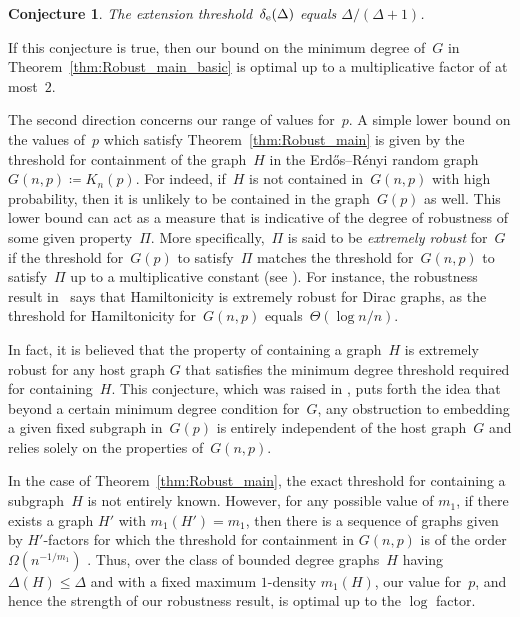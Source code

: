 \documentclass[final]{article}
\newtheorem{conj}[theorem]{Conjecture}
\theoremstyle{definition}
\newcommand{\exth}{\delta_{\rm e}(\Delta)}
\begin{document}
\begin{conj}
  The extension threshold~$\exth$ equals $\Delta/(\Delta+1)$.
\end{conj}

If this conjecture is true, then our
bound on the minimum degree of~$G$ in Theorem~\ref{thm:Robust_main_basic} is optimal up to a multiplicative factor of at most~$2$.

The second direction concerns our range of values for~$p$. A simple lower
bound on the values of~$p$ which satisfy Theorem~\ref{thm:Robust_main}
is given by the threshold for containment of the graph~$H$ in the Erd\H
os--R\'{e}nyi random graph~$G(n, p) \coloneqq K_n(p)$. For indeed, if~$H$ is not contained in~$G(n,p)$ with high probability, then it is unlikely to be contained in the graph~$G(p)$ as well. This lower
bound can act as a measure that is indicative of the degree of robustness of some given
property~$\Pi$. More specifically,~$\Pi$ is said to be \emph{extremely robust} for~$G$ if the
threshold for~$G(p)$ to satisfy~$\Pi$ matches the
threshold for~$G(n,p)$ to satisfy~$\Pi$ up to a multiplicative constant (see
\cite{toolkit_robust_thresholds}). For instance,
the robustness result in~\cite{robust_hamiltonicity} says that Hamiltonicity is extremely robust for Dirac graphs, as the threshold for Hamiltonicity 
for~$G(n,p)$ equals~$\Theta(\log n/n)$. 

In fact, it is believed that the property of containing a graph~$H$ is extremely robust for any host graph $G$ that satisfies the minimum degree threshold required for containing~$H$. This conjecture, which was raised in \cite{Alp_robustness_spread, toolkit_robust_thresholds}, puts forth the idea that beyond a certain minimum degree condition for~$G$, any obstruction to embedding a given fixed subgraph in~$G(p)$ is entirely independent of the host graph~$G$ and relies solely on the properties of~$G(n,p)$.  

In the case of Theorem~\ref{thm:Robust_main}, the exact threshold for
containing a subgraph~$H$ is not entirely known. However, for any possible value of $m_1$, if there exists a graph $H'$ with $m_1(H') = m_1$, then there is a sequence of graphs given by $H'$-factors for which the threshold for containment in $G(n,p)$ is of the order $\Omega(n^{-1/m_1})$ \cite{K_rfactor_threshold}. 
Thus, over the class of bounded degree graphs~$H$ having $\Delta(H) \leq \Delta$ and with a fixed maximum $1$-density $m_1(H)$, our value for~$p$, and hence
the strength of our robustness result, is optimal up to the $\log$
factor.
\end{document}
